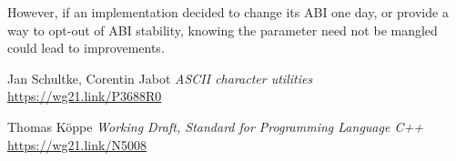 \documentclass{wg21}
\begin{document}
However, if an implementation decided to change its ABI one day, or provide a way to opt-out of ABI stability, knowing the  parameter need not be mangled
could lead to improvements.





\renewcommand{\section}[2]{}%

\begin{thebibliography}{9}

Jan Schultke, Corentin Jabot
\emph{ASCII character utilities}\newline
\url{https://wg21.link/P3688R0}

Thomas Köppe
\emph{Working Draft, Standard for Programming Language C++}\newline
\url{https://wg21.link/N5008}


\end{thebibliography}
\end{document}
